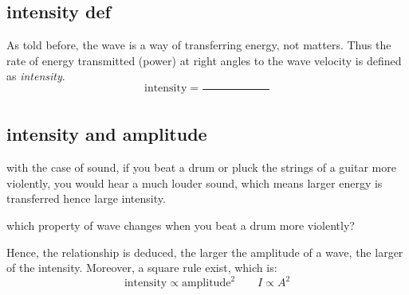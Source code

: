 \documentclass[a4paper]{tufte-handout}
\newenvironment{TaskBox} %
{\begin{tcolorbox}[breakable,colback=b1!30,colframe=b1,title=Task]} {\end{tcolorbox}}
\begin{document}
\subsection{intensity def}
As told before, the wave is a way of transferring energy, not matters. Thus the rate of energy transmitted (power) \uline{\phantom{per unit area     }} at right angles to the wave velocity is defined as \emph{intensity}.
\[
  \text{intensity} = \frac{}{\hspace{1in}}
\]

\subsection{intensity and amplitude}
with the case of sound, if you beat a drum or pluck the strings of a guitar more violently, you would hear a much louder sound, which means larger energy is transferred hence large intensity.
\begin{TaskBox}
which property of wave changes when you beat a drum more violently?
\end{TaskBox}
Hence, the relationship is deduced, the larger the amplitude of a wave, the larger of the intensity. Moreover, a square rule exist, which is:
\[
  \text{intensity} \propto \text{amplitude}^2 \qquad I \propto A^2
\]
\end{document}
